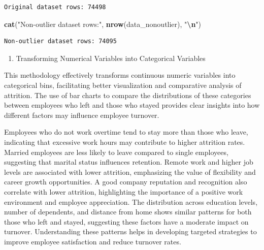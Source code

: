 \documentclass[
  10pt,
  paper=a4,
  ,captions=tableheading
]{scrartcl}
\newenvironment{Shaded}{\begin{snugshade}}{\end{snugshade}}
\newcommand{\FunctionTok}[1]{\textcolor[rgb]{0.13,0.29,0.53}{\textbf{#1}}}
\newcommand{\NormalTok}[1]{#1}
\newcommand{\SpecialCharTok}[1]{\textcolor[rgb]{0.81,0.36,0.00}{\textbf{#1}}}
\newcommand{\StringTok}[1]{\textcolor[rgb]{0.31,0.60,0.02}{#1}}
\providecommand{\tightlist}{%
  \setlength{\itemsep}{0pt}\setlength{\parskip}{0pt}}
\begin{document}
\begin{verbatim}
Original dataset rows: 74498 
\end{verbatim}

\begin{Shaded}
\begin{Highlighting}[]
\FunctionTok{cat}\NormalTok{(}\StringTok{"Non{-}outlier dataset rows:"}\NormalTok{, }\FunctionTok{nrow}\NormalTok{(data\_nonoutlier), }\StringTok{"}\SpecialCharTok{\textbackslash{}n}\StringTok{"}\NormalTok{)}
\end{Highlighting}
\end{Shaded}

\begin{verbatim}
Non-outlier dataset rows: 74095 
\end{verbatim}

\small

\begin{enumerate}
\def\labelenumi{\arabic{enumi}.}
\setcounter{enumi}{7}
\tightlist
\item
  Transforming Numerical Variables into Categorical Variables
\end{enumerate}

This methodology effectively transforms continuous numeric variables
into categorical bins, facilitating better visualization and comparative
analysis of attrition. The use of bar charts to compare the
distributions of these categories between employees who left and those
who stayed provides clear insights into how different factors may
influence employee turnover.

Employees who do not work overtime tend to stay more than those who
leave, indicating that excessive work hours may contribute to higher
attrition rates. Married employees are less likely to leave compared to
single employees, suggesting that marital status influences retention.
Remote work and higher job levels are associated with lower attrition,
emphasizing the value of flexibility and career growth opportunities. A
good company reputation and recognition also correlate with lower
attrition, highlighting the importance of a positive work environment
and employee appreciation. The distribution across education levels,
number of dependents, and distance from home shows similar patterns for
both those who left and stayed, suggesting these factors have a moderate
impact on turnover. Understanding these patterns helps in developing
targeted strategies to improve employee satisfaction and reduce turnover
rates.

\small
\end{document}
